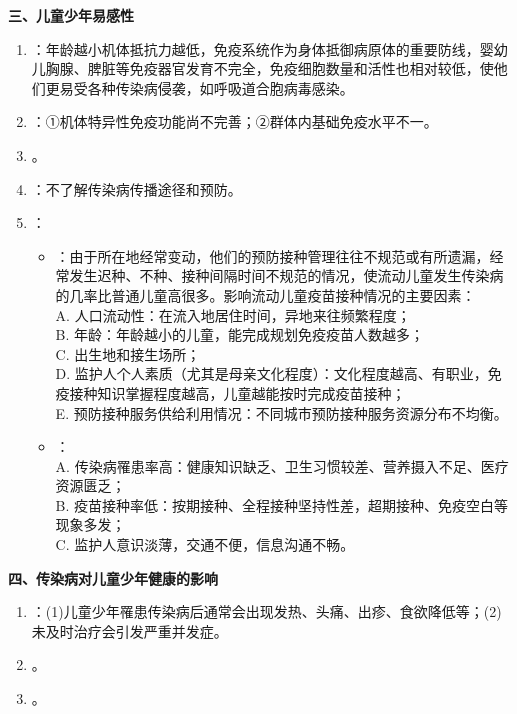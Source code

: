\begin{keybox}
\textbf{三、儿童少年易感性}
\begin{enumerate}[leftmargin=*]
    \item {}：年龄越小机体抵抗力越低，免疫系统作为身体抵御病原体的重要防线，婴幼儿胸腺、脾脏等免疫器官发育不完全，免疫细胞数量和活性也相对较低，使他们更易受各种传染病侵袭，如呼吸道合胞病毒感染。
    \item {}：①机体特异性免疫功能尚不完善；②群体内基础免疫水平不一。
    \item {}。
    \item {}：不了解传染病传播途径和预防。
    \item {}：
    \begin{itemize}
        \item {}：由于所在地经常变动，他们的预防接种管理往往不规范或有所遗漏，经常发生迟种、不种、接种间隔时间不规范的情况，使流动儿童发生传染病的几率比普通儿童高很多。影响流动儿童疫苗接种情况的主要因素：\\
        A. 人口流动性：在流入地居住时间，异地来往频繁程度；\\
        B. 年龄：年龄越小的儿童，能完成规划免疫疫苗人数越多；\\
        C. 出生地和接生场所；\\
        D. 监护人个人素质（尤其是母亲文化程度）：文化程度越高、有职业，免疫接种知识掌握程度越高，儿童越能按时完成疫苗接种；\\
        E. 预防接种服务供给利用情况：不同城市预防接种服务资源分布不均衡。
        \item {}：\\
        A. 传染病罹患率高：健康知识缺乏、卫生习惯较差、营养摄入不足、医疗资源匮乏；\\
        B. 疫苗接种率低：按期接种、全程接种坚持性差，超期接种、免疫空白等现象多发；\\
        C. 监护人意识淡薄，交通不便，信息沟通不畅。
    \end{itemize}
\end{enumerate}

\textbf{四、传染病对儿童少年健康的影响}
\begin{enumerate}[leftmargin=*]
    \item {}：(1)儿童少年罹患传染病后通常会出现发热、头痛、出疹、食欲降低等；(2)未及时治疗会引发严重并发症。
    \item {}。
    \item {}。
\end{enumerate}
\end{keybox}

